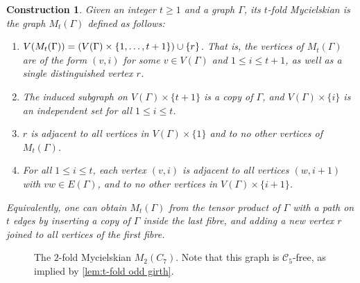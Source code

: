 \documentclass[reqno, english, 12pt]{amsart}
\theoremstyle{plain}
\newtheorem{construction}[theorem]{Construction}
\theoremstyle{remark}
\DeclarePairedDelimiter{\set}{\{}{\}}
\renewcommand{\leq}{\leqslant}
\renewcommand{\geq}{\geqslant}
\newcommand\C{\mathscr{C}}
\begin{document}
\begin{construction}\label{def:t-fold mycielskian}
	Given an integer $t \geq 1$ and a graph $\Gamma$, its \emph{$t$-fold Mycielskian} is the graph $M_t(\Gamma)$ defined as follows:
\begin{enumerate}
    \item $V(M_t(\Gamma)) = (V(\Gamma) \times \{1,\dots,t+1\}) \cup \set{r}$. That is, the vertices of $M_t(\Gamma)$ are of the form $(v,i)$ for some $v \in V(\Gamma)$ and $1 \leq i \leq t+1$, as well as a single distinguished vertex $r$.
    \item The induced subgraph on $V(\Gamma) \times \{t+1\}$ is a copy of $\Gamma$, and $V(\Gamma) \times \{i\}$ is an independent set for all $1 \leq i \leq t$.
    \item $r$ is adjacent to all vertices in $V(\Gamma) \times \{1\}$ and to no other vertices of $M_t(\Gamma)$.
    \item For all $1 \leq i \leq t$, each vertex $(v,i)$ is adjacent to all vertices $(w,i+1)$ with $vw \in E(\Gamma)$, and to no other vertices in $V(\Gamma) \times \{i+1\}$.
\end{enumerate}

Equivalently, one can obtain $M_t(\Gamma)$ from the tensor product of $\Gamma$ with a path on $t$ edges by inserting a copy of $\Gamma$ inside the last fibre, and adding a new vertex $r$ joined to all vertices of the first fibre.
\end{construction}
\begin{figure}[h]
    \centering
    \caption{The $2$-fold Mycielskian  $M_2(C_7)$. Note that this graph is $\C_5$-free, as implied by \cref{lem:t-fold odd girth}.}
\end{figure}
\end{document}
